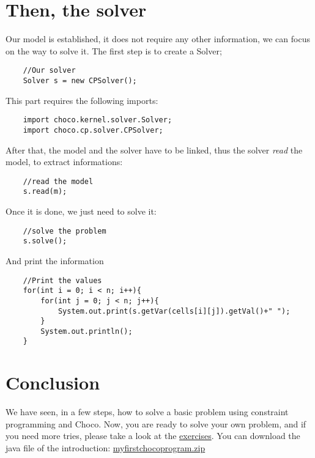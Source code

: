 \section{Then, the solver}\label{gettingstarted:then,thesolver}\hypertarget{gettingstarted:then,thesolver}{}
Our model is established, it does not require any other information, we can focus on the way to solve it.
The first step is to create a Solver;
\begin{lstlisting}
	//Our solver              
	Solver s = new CPSolver();
\end{lstlisting}
This part requires the following imports:
\begin{lstlisting}
	import choco.kernel.solver.Solver;
	import choco.cp.solver.CPSolver;
\end{lstlisting}

After that, the model and the solver have to be linked, thus the solver \emph{read} the model, to extract informations:
\begin{lstlisting}
	//read the model
	s.read(m);
\end{lstlisting}

Once it is done, we just need to solve it:
\begin{lstlisting}
	//solve the problem
	s.solve();
\end{lstlisting}
And print the information
\begin{lstlisting}
	//Print the values                                           
	for(int i = 0; i < n; i++){                                  
	    for(int j = 0; j < n; j++){                              
	        System.out.print(s.getVar(cells[i][j]).getVal()+" ");
	    }                                                        
	    System.out.println();                                    
	}
\end{lstlisting}

\section{Conclusion}\label{gettingstarted:conclusion}\hypertarget{gettingstarted:conclusion}{}
We have seen, in a few steps, how to solve a basic problem using constraint programming and Choco. Now, you are ready to solve your own problem, and if you need more tries, please take a look at the \hyperlink{exercises}{exercises}. %
You can download the java file of the introduction: \href{media/zip/myfirstchocoprogram.zip}{myfirstchocoprogram.zip}
